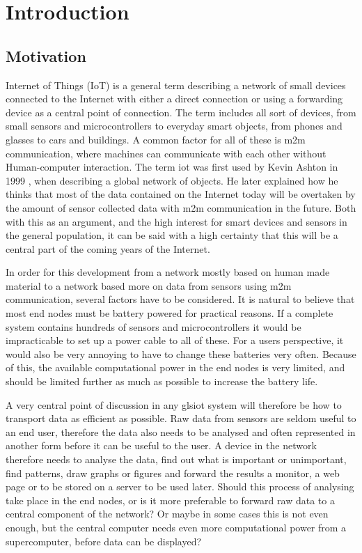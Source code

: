 \chapter{Introduction}
\label{chp:introduction} 


\section{Motivation}

\noindent Internet of Things (IoT) is a general term describing a network of small devices connected to the Internet with either a direct connection or using a forwarding device as a central point of connection. The term includes all sort of devices, from small sensors and microcontrollers to everyday smart objects, from phones and glasses to cars and buildings. A common factor for all of these is \gls{m2m} communication, where machines can communicate with each other without Human-computer interaction. The term \gls{iot} was first used by Kevin Ashton in 1999 \cite{ashton2009internet}, when describing a global network of objects. He later explained how he thinks that most of the data contained on the Internet today will be overtaken by the amount of sensor collected data with \gls{m2m} communication in the future. Both with this as an argument, and the high interest for smart devices and sensors in the general population, it can be said with a high certainty that this will be a central part of the coming years of the Internet. 

\noindent In order for this development from a network mostly based on human made material to a network based more on data from sensors using \gls{m2m} communication, several factors have to be considered. It is natural to believe that most end nodes must be battery powered for practical reasons. If a complete system contains hundreds of sensors and microcontrollers it would be impracticable to set up a power cable to all of these. For a users perspective, it would also be very annoying to have to change these batteries very often. Because of this, the available computational power in the end nodes is very limited, and should be limited further as much as possible to increase the battery life. 

\noindent A very central point of discussion in any gls{iot} system will therefore be how to transport data as efficient as possible. Raw data from sensors are seldom useful to an end user, therefore the data also needs to be analysed and often represented in another form before it can be useful to the user. A device in the network therefore needs to analyse the data, find out what is important or unimportant, find patterns, draw graphs or figures and forward the results a monitor, a web page or to be stored on a server to be used later. Should this process of analysing take place in the end nodes, or is it more preferable to forward raw data to a central component of the network? Or maybe in some cases this is not even enough, but the central computer needs even more computational power from a supercomputer, before data can be displayed?  


